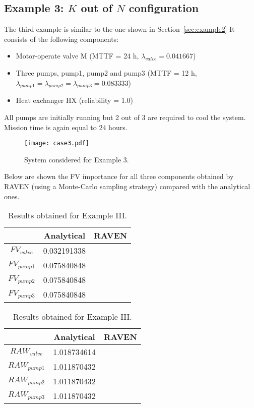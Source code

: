 \subsection{Example 3: $K$ out of $N$ configuration}
\label{sec:example3}

The third example is similar to the one shown in Section~\ref{sec:example2}
It consists of the following components:
\begin{itemize}
  \item Motor-operate valve M (MTTF = 24 h, $\lambda_{valve} = 0.041667$)
  \item Three pumps, pump1, pump2 and pump3 
        (MTTF = 12 h, $\lambda_{pump1} = \lambda_{pump2} = \lambda_{pump3} = 0.083333$)
  \item Heat exchanger HX (reliability = 1.0)
\end{itemize}
All pumps are initially running but 2 out of 3 are required to cool the system.
Mission time is again equal to 24 hours.

\begin{figure}
    \centering
    \centerline{\texttt{[image: case3.pdf]}}
    \caption{System considered for Example 3.}
    \label{fig:example4}
\end{figure}

Below are shown the FV importance for all three components obtained by RAVEN (using a Monte-Carlo 
sampling strategy) compared with the analytical ones.

\begin{table}
    \caption{Results obtained for Example III.}
    \begin{minipage}{.5\linewidth}
      \centering
      \begin{tabular}{c | c | c } 
        \hline 
         & Analytical & RAVEN \\ 
        \hline 
        $FV_{valve}$ & 0.032191338 &   \\
        $FV_{pump1}$ & 0.075840848 &   \\
        $FV_{pump2}$ & 0.075840848 &   \\
        $FV_{pump3}$ & 0.075840848 &   \\ 
        \hline 
      \end{tabular}
    \end{minipage}%
    \begin{minipage}{.5\linewidth}
      \centering
      \begin{tabular}{c | c | c } 
        \hline 
         & Analytical & RAVEN \\ 
        \hline 
        $RAW_{valve}$ & 1.018734614 &   \\
        $RAW_{pump1}$ & 1.011870432 &   \\
        $RAW_{pump2}$ & 1.011870432 &   \\
        $RAW_{pump3}$ & 1.011870432 &   \\ 
        \hline 
      \end{tabular}
    \end{minipage} 
    \label{tab:example3}
\end{table}


